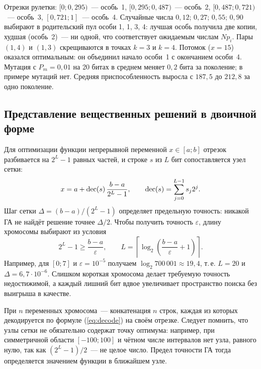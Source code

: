 Отрезки рулетки: $[0; 0,295)$~--- особь~1, $[0,295; 0,487)$~--- особь~2, $[0,487; 0,721)$~--- особь~3,
$[0,721; 1]$~--- особь~4. Случайные числа $0,12$; $0,27$; $0,55$; $0,90$ выбирают в родительский пул особи
1, 1, 3, 4: лучшая особь получила две копии, худшая (особь~2)~--- ни одной, что соответствует
ожидаемым числам $Np_i$. Пары $(1, 4)$ и $(1, 3)$ скрещиваются в точках $k = 3$ и $k = 4$. Потомок
 ($x = 15$) оказался оптимальным: он объединил начало  особи~1 с окончанием
 особи~4. Мутация с $P_m = 0,01$ на 20 битах в среднем меняет $0,2$ бита за поколение; в
примере мутаций нет. Средняя приспособленность выросла с $187,5$ до $212,8$ за одно поколение.

\subsection{Представление вещественных решений в двоичной форме}

Для оптимизации функции непрерывной переменной $x \in [a; b]$ отрезок разбивается на $2^L - 1$ равных
частей, и строке $s$ из $L$ бит сопоставляется узел сетки:
\begin{equation}
\label{eq:decode}
x = a + \operatorname{dec}(s)\,\frac{b - a}{2^L - 1}, \qquad \operatorname{dec}(s) = \sum_{j=0}^{L-1} s_j 2^j .
\end{equation}
Шаг сетки $\Delta = (b - a)/(2^L - 1)$ определяет предельную точность: никакой ГА не найдёт решение
точнее $\Delta/2$. Чтобы получить точность $\varepsilon$, длину хромосомы выбирают из условия
\begin{equation}
\label{eq:chrom-length}
2^L - 1 \ge \frac{b - a}{\varepsilon}, \qquad L = \left\lceil \log_2\left(\frac{b - a}{\varepsilon} + 1\right)\right\rceil .
\end{equation}
Например, для $[0; 7]$ и $\varepsilon = 10^{-5}$ получаем $\log_2 700\,001 \approx 19,4$, т.\,е. $L = 20$ и
$\Delta = 6,7\cdot 10^{-6}$. Слишком короткая хромосома делает требуемую точность недостижимой, а каждый лишний
бит вдвое увеличивает пространство поиска без выигрыша в качестве.

При $n$ переменных хромосома~--- конкатенация $n$ строк, каждая из которых декодируется по формуле
(\ref{eq:decode}) на своём отрезке. Следует помнить, что узлы сетки не обязательно содержат точку
оптимума: например, при симметричной области $[-100; 100]$ и чётном числе интервалов нет узла, равного
нулю, так как $(2^L - 1)/2$~--- не целое число. Предел точности ГА тогда определяется значением функции
в ближайшем узле.

